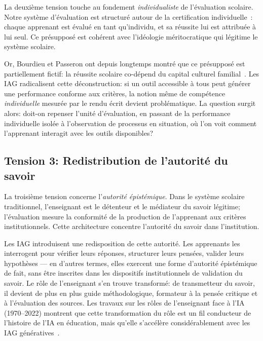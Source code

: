 La deuxi\`eme tension touche au fondement \emph{individualiste} de l'\'evaluation scolaire.
Notre syst\`eme d'\'evaluation est structur\'e autour de la certification individuelle~: chaque apprenant est \'evalu\'e en tant qu'individu, et sa r\'eussite lui est attribu\'ee \`a lui seul.
Ce pr\'esuppos\'e est coh\'erent avec l'id\'eologie m\'eritocratique qui l\'egitime le syst\`eme scolaire.

Or, Bourdieu et Passeron ont depuis longtemps montr\'e que ce pr\'esuppos\'e est partiellement fictif: la r\'eussite scolaire co-d\'epend du capital culturel familial~\cite{bourdieu1970}.
Les IAG radicalisent cette d\'econstruction: si un outil accessible \`a tous peut g\'en\'erer une performance conforme aux crit\`eres, la notion m\^eme de comp\'etence \emph{individuelle} mesur\'ee par le rendu \'ecrit devient probl\'ematique. 
La question surgit alors: doit-on repenser l'unit\'e d'\'evaluation, en passant de la performance individuelle isol\'ee \`a
l'observation de processus en situation, o\`u l'on voit comment l'apprenant interagit avec les outils disponibles?

\subsection*{Tension 3: Redistribution de l'autorit\'e du savoir}

La troisi\`eme tension concerne l'\emph{autorit\'e \'epist\'emique}. 
Dans le syst\`eme scolaire traditionnel, l'enseignant est le d\'etenteur et le m\'ediateur du savoir l\'egitime; l'\'evaluation mesure la conformit\'e de la production de l'apprenant aux crit\`eres institutionnels. 
Cette architecture concentre l'autorit\'e du savoir dans l'institution.

Les IAG introduisent une redisposition de cette autorit\'e. 
Les apprenants les interrogent pour v\'erifier leurs r\'eponses, structurer leurs pens\'ees, valider leurs hypoth\`eses --- en d'autres termes, elles exercent une forme d'autorit\'e \'epist\'emique de fait, sans \^etre inscrites dans les dispositifs institutionnels de validation du savoir. 
Le r\^ole de l'enseignant s'en trouve transform\'e: de transmetteur du savoir, il devient de plus en plus guide m\'ethodologique, formateur \`a la pens\'ee critique et \`a l'\'evaluation des sources.
Les travaux sur les r\^oles de l'enseignant face \`a l'IA (1970--2022) montrent que cette transformation du r\^ole est un fil conducteur de l'histoire de l'IA en \'education, mais qu'elle s'acc\'el\`ere consid\'erablement avec les IAG g\'en\'eratives~\cite{rolesenseignantIA2023}.

